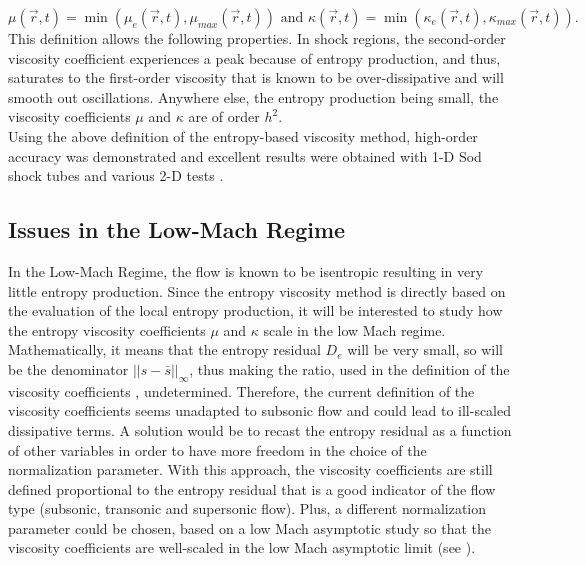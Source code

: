\begin{equation}
\mu(\vec{r},t) = \min\left( \mu_e(\vec{r},t), \mu_{max}(\vec{r},t) \right) \text{ and } \kappa(\vec{r},t) = \min\left( \kappa_e(\vec{r},t), \kappa_{max}(\vec{r},t) \right).
\end{equation}
This definition allows the following properties.
In shock regions, the second-order viscosity coefficient experiences a peak because of entropy production, and thus, saturates to the first-order viscosity that is known to be over-dissipative and will smooth out oscillations. Anywhere else, the entropy production being small, the viscosity coefficients $\mu$ and $\kappa$ are of order $h^2$.\\
Using the above definition of the entropy-based viscosity method, high-order accuracy was demonstrated and excellent results were obtained with 1-D Sod shock tubes and various 2-D tests \cite{jlg1, jlg2, valentin}.
\subsection{Issues in the Low-Mach Regime} 
In the Low-Mach Regime, the flow is known to be isentropic resulting in very little entropy production. Since the entropy viscosity method is directly based on the evaluation of the local entropy production, it will be interested to study how the entropy viscosity coefficients $\mu$ and $\kappa$ scale in the low Mach regime. Mathematically, it means that the entropy residual $D_e$ will be very small, so will be the denominator $|| s - \bar{s} ||_{\infty}$, thus making the ratio, used in the definition of the viscosity coefficients , undetermined.  Therefore, the current definition of the viscosity coefficients seems unadapted to subsonic flow and could lead to ill-scaled dissipative terms. A solution would be to recast the entropy residual as a function of other variables in order to have more freedom in the choice of the normalization parameter. 
With this approach, the viscosity coefficients are still defined proportional to the entropy residual that is a good indicator of the flow type (subsonic, transonic and supersonic flow). Plus, a different normalization parameter could be chosen, based on a low Mach asymptotic study so that the viscosity coefficients are well-scaled in the low Mach asymptotic limit (see ).
